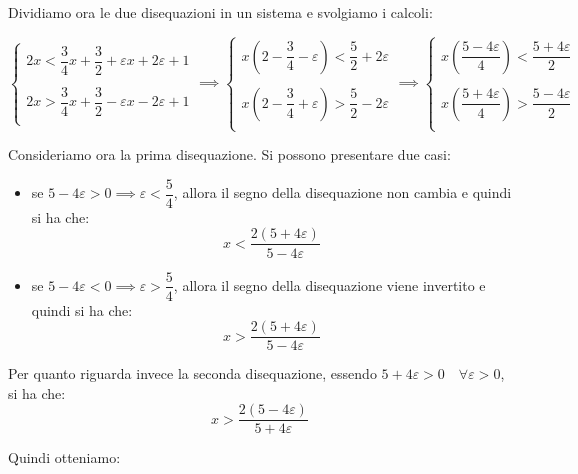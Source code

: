 \documentclass{article}
\begin{document}
\noindent Dividiamo ora le due disequazioni in un sistema e svolgiamo i calcoli:

\begin{equation*}
    \begin{cases}
        2x < \dfrac{3}{4}x + \dfrac{3}{2} + \varepsilon x + 2\varepsilon + 1 \\
        \\
        2x > \dfrac{3}{4}x + \dfrac{3}{2} - \varepsilon x - 2\varepsilon + 1 \\
    \end{cases}
    \implies
    \begin{cases}
        x\left(2 - \dfrac{3}{4} - \varepsilon\right) < \dfrac{5}{2} + 2\varepsilon \\
        \\
        x\left(2 - \dfrac{3}{4} + \varepsilon \right)>  \dfrac{5}{2} - 2\varepsilon \\
    \end{cases}
    \implies
    \begin{cases}
        x\left(\dfrac{5 - 4\varepsilon}{4}\right) < \dfrac{5 + 4\varepsilon}{2}\\
        \\
        x\left(\dfrac{5 + 4\varepsilon}{4}\right)>  \dfrac{5 - 4\varepsilon}{2} \\
    \end{cases}
\end{equation*}

\noindent Consideriamo ora la prima disequazione. Si possono presentare due casi:

\begin{itemize}
    \item se $5 - 4\varepsilon > 0 \implies \varepsilon < \dfrac{5}{4}$, allora il segno della disequazione non cambia e quindi si ha che: $$x < \frac{2(5+4\varepsilon)}{5-4\varepsilon}$$
    \item se $5 - 4\varepsilon < 0 \implies \varepsilon > \dfrac{5}{4}$, allora il segno della disequazione viene invertito e quindi si ha che: $$x > \frac{2(5 + 4\varepsilon)}{5 - 4\varepsilon}$$
\end{itemize}

\noindent Per quanto riguarda invece la seconda disequazione, essendo $5+4\varepsilon>0 \quad \forall \varepsilon > 0$, si ha che: $$x > \frac{2(5-4\varepsilon)}{5 + 4\varepsilon}$$

\noindent Quindi otteniamo: 
\end{document}
